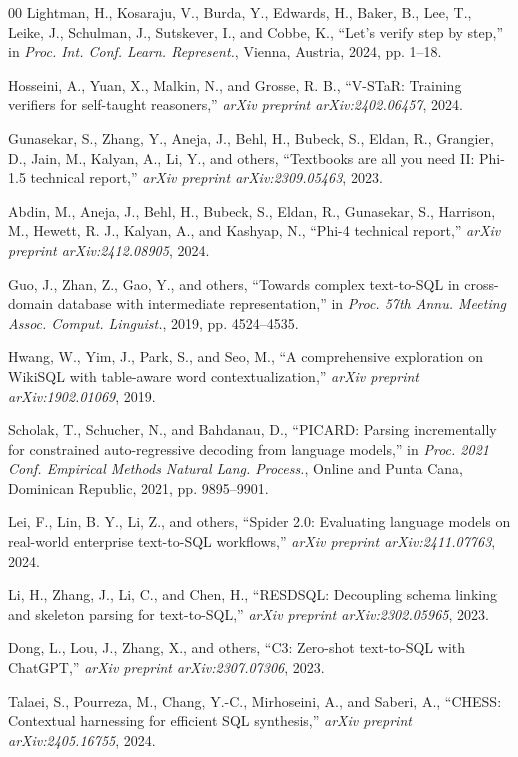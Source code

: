 \documentclass[conference]{IEEEtran}
\begin{document}
\begin{thebibliography}{00}
 Lightman, H., Kosaraju, V., Burda, Y., Edwards, H., Baker, B., Lee, T., Leike, J., Schulman, J., Sutskever, I., and Cobbe, K., ``Let's verify step by step,'' in \textit{Proc. Int. Conf. Learn. Represent.}, Vienna, Austria, 2024, pp. 1--18.

 Hosseini, A., Yuan, X., Malkin, N., and Grosse, R. B., ``V-STaR: Training verifiers for self-taught reasoners,'' \textit{arXiv preprint arXiv:2402.06457}, 2024.

 Gunasekar, S., Zhang, Y., Aneja, J., Behl, H., Bubeck, S., Eldan, R., Grangier, D., Jain, M., Kalyan, A., Li, Y., and others, ``Textbooks are all you need II: Phi-1.5 technical report,'' \textit{arXiv preprint arXiv:2309.05463}, 2023.

 Abdin, M., Aneja, J., Behl, H., Bubeck, S., Eldan, R., Gunasekar, S., Harrison, M., Hewett, R. J., Kalyan, A., and Kashyap, N., ``Phi-4 technical report,'' \textit{arXiv preprint arXiv:2412.08905}, 2024.

 Guo, J., Zhan, Z., Gao, Y., and others, ``Towards complex text-to-SQL in cross-domain database with intermediate representation,'' in \textit{Proc. 57th Annu. Meeting Assoc. Comput. Linguist.}, 2019, pp. 4524--4535.

 Hwang, W., Yim, J., Park, S., and Seo, M., ``A comprehensive exploration on WikiSQL with table-aware word contextualization,'' \textit{arXiv preprint arXiv:1902.01069}, 2019.

 Scholak, T., Schucher, N., and Bahdanau, D., ``PICARD: Parsing incrementally for constrained auto-regressive decoding from language models,'' in \textit{Proc. 2021 Conf. Empirical Methods Natural Lang. Process.}, Online and Punta Cana, Dominican Republic, 2021, pp. 9895--9901.

 Lei, F., Lin, B. Y., Li, Z., and others, ``Spider 2.0: Evaluating language models on real-world enterprise text-to-SQL workflows,'' \textit{arXiv preprint arXiv:2411.07763}, 2024.

 Li, H., Zhang, J., Li, C., and Chen, H., ``RESDSQL: Decoupling schema linking and skeleton parsing for text-to-SQL,'' \textit{arXiv preprint arXiv:2302.05965}, 2023.

 Dong, L., Lou, J., Zhang, X., and others, ``C3: Zero-shot text-to-SQL with ChatGPT,'' \textit{arXiv preprint arXiv:2307.07306}, 2023.

 Talaei, S., Pourreza, M., Chang, Y.-C., Mirhoseini, A., and Saberi, A., ``CHESS: Contextual harnessing for efficient SQL synthesis,'' \textit{arXiv preprint arXiv:2405.16755}, 2024.


\end{thebibliography}
\end{document}
